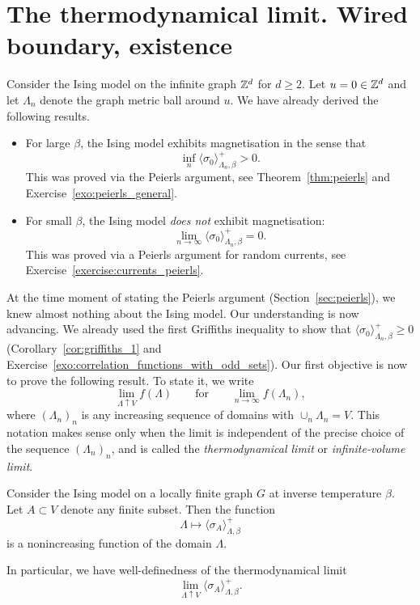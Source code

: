 \section{The thermodynamical limit. Wired boundary, existence}
\label{sec:infinite_volume}

Consider the Ising model on the infinite graph $\mathbb Z^d$ for $d\geq 2$.
Let $u=0\in\mathbb Z^d$ and let $\Lambda_n$ denote the graph metric ball around $u$.
We have already derived the following results.
\begin{itemize}
    \item For large $\beta$,
    the Ising model exhibits magnetisation
    in the sense that
    \[
        \inf_{n}\langle\sigma_0\rangle_{\Lambda_n,\beta}^+
        >0.
    \]
    This was proved via the Peierls argument, see Theorem~\ref{thm:peierls}
    and Exercise~\ref{exo:peierls_general}.
    \item For small $\beta$,
    the Ising model \emph{does not} exhibit magnetisation:
    \[
        \lim_{n\to\infty}\langle\sigma_0\rangle_{\Lambda_n,\beta}^+
        =0.
    \]
    This was proved via a Peierls argument for random currents,
    see Exercise~\ref{exercise:currents_peierls}.
\end{itemize}
At the time moment of stating the Peierls argument (Section~\ref{sec:peierls}),
we knew almost nothing about the Ising model.
Our understanding is now advancing.
We already used the first Griffiths inequality to show that $\langle\sigma_0\rangle_{\Lambda_n,\beta}^+\geq 0$
(Corollary~\ref{cor:griffiths_1}
and Exercise~\ref{exo:correlation_functions_with_odd_sets}).
Our first objective is now to prove the following result.
To state it, we write
\[
    \lim_{\Lambda\uparrow V}f(\Lambda)
    \qquad\text{for}\qquad
    \lim_{n\to\infty}f(\Lambda_n),
\]
where $(\Lambda_n)_n$ is any increasing sequence of domains 
with $\cup_n\Lambda_n=V$.
This notation makes sense only when the limit is independent
of the precise choice of the sequence $(\Lambda_n)_n$,
and is called the \emph{thermodynamical limit} or \emph{infinite-volume limit}.

\begin{lemma}
    \label{lemma:correlation_functions_monotone}
    Consider the Ising model on a locally finite graph
    $G$ at inverse temperature $\beta$.
    Let $A\subset V$ denote any finite subset.
    Then the function
    \[
        \Lambda\mapsto
        \langle\sigma_A\rangle_{\Lambda,\beta}^+
    \]
    is a nonincreasing function of the domain $\Lambda$.

    In particular, we have well-definedness of the thermodynamical limit
    \[
        \lim_{\Lambda\uparrow V}
        \langle\sigma_A\rangle_{\Lambda,\beta}^+.
    \]
\end{lemma}


